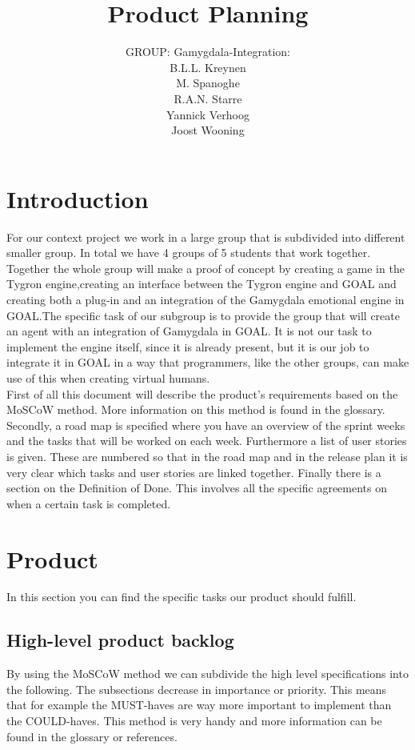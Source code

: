 \documentclass[]{article}
\title{Product Planning}
\author{GROUP: Gamygdala-Integration:\\
	B.L.L. Kreynen\\
	M. Spanoghe\\
	R.A.N. Starre\\
	Yannick Verhoog\\
	Joost Wooning\\
	}
\begin{document}
\maketitle
\pagebreak
\tableofcontents
\pagebreak
\section{Introduction}
For our context project we work in a large group that is subdivided into different smaller group. In total we have 4 groups of 5 students that work together. Together the whole group will make a proof of concept by creating a game in the Tygron engine,creating an interface between the Tygron engine and \gls{GOAL} and creating both a plug-in and an integration of the \gls{Gamygdala} emotional engine in GOAL.The specific task of our subgroup is to provide the group that will create an agent with an integration of Gamygdala in GOAL. It is not our task to implement the engine itself, since it is already present, but it is our job to integrate it in GOAL in a way that programmers, like the other groups, can make use of this when creating virtual humans.
\\
First of all this document will describe the product's requirements based on the MoSCoW method. More information on this method is found in the glossary. Secondly, a road map is specified where you have an overview of the sprint weeks and the tasks that will be worked on each week. Furthermore a list of user stories is given. These are numbered so that in the road map and in the release plan it is very clear which tasks and user stories are linked together. Finally there is a section on the Definition of Done. This involves all the specific agreements on when a certain task is completed. 
\section{Product}
In this section you can find the specific tasks our product should fulfill.
\subsection{High-level product backlog}
By using the \gls{MoSCoW} method we can subdivide the high level specifications into the following. The subsections decrease in importance or priority. This means that for example the MUST-haves are way more important to implement than the COULD-haves. This method is very handy and more information can be found in the glossary or references.
\end{document}
